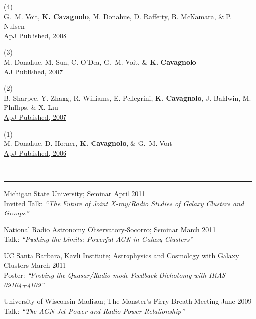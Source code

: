 \documentclass[12pt]{cv}
\newcommand{\myhead}{Cavagnolo, Publications}
\begin{document}
(4) {}\\
G.~M. Voit, {\bf K. Cavagnolo}, M. Donahue, D. Rafferty, B. McNamara, \& P. Nulsen\\
\href{http://adsabs.harvard.edu/abs/2008ApJ...681L...5V}{ApJ Published, 2008}

(3) {}\\
M. Donahue, M. Sun, C. O'Dea, G.~M. Voit, \& {\bf K. Cavagnolo}\\
\href{http://adsabs.harvard.edu/abs/2007AJ....134...14D}{AJ Published, 2007}

(2) {}\\
B. Sharpee, Y. Zhang, R. Williams, E. Pellegrini, {\bf K. Cavagnolo}, J. Baldwin, M. Phillips, \& X. Liu\\
\href{http://adsabs.harvard.edu/abs/2007ApJ...659.1265S}{ApJ Published, 2007}

(1) {}\\
M. Donahue, D. Horner, {\bf K. Cavagnolo}, \& G.~M. Voit\\
\href{http://adsabs.harvard.edu/abs/2006ApJ...643..730D}{ApJ Published, 2006}

\markright{\myhead}
{\large{}}\vspace{-0.3cm}\\
\rule{\linewidth}{0.5pt}
Michigan State University; Seminar \hfill April 2011\\
Invited Talk: {\textit{``The Future of Joint X-ray/Radio Studies of Galaxy Clusters and Groups''}}

National Radio Astronomy Observatory-Socorro; Seminar \hfill March 2011\\
Talk: {\textit{``Pushing the Limits: Powerful AGN in Galaxy Clusters''}}

UC Santa Barbara, Kavli Institute; Astrophysics and Cosmology with Galaxy Clusters \hfill March 2011\\
Poster: {\textit{``Probing the Quasar/Radio-mode Feedback Dichotomy with IRAS 09104+4109''}}

University of Wisconsin-Madison; The Monster's Fiery Breath Meeting \hfill June 2009\\
Talk: {\textit{``The AGN Jet Power and Radio Power Relationship''}}
\end{document}
